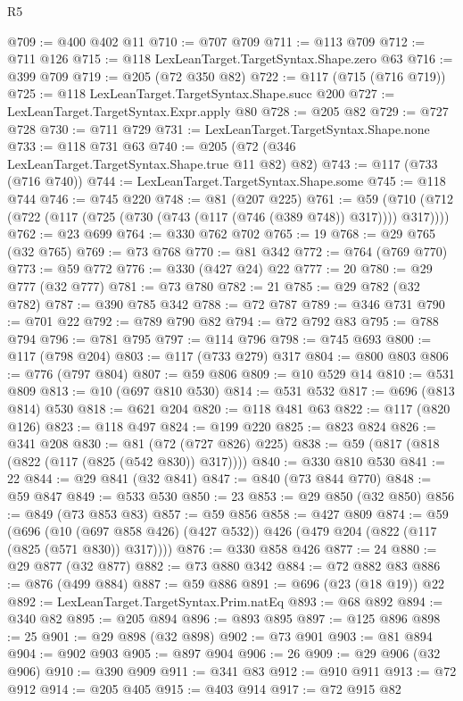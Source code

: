 \begin{lexlean}{R5}
\begin{coremodule}
{{{{{{{{{{{{{{{{{{{{{{{{{{{{{{{{{{{{{{{{{{{{{{{{{{{{{{{{{{{{{{{{{{{{{{{{{{{{{{{{{{{{{{{{{{{{@709 := @400 @402 @11
@710 := @707 @709
@711 := @113 @709
@712 := @711 @126
@715 := @118 LexLeanTarget.TargetSyntax.Shape.zero @63
@716 := @399 @709
@719 := @205 (@72 @350 @82)
@722 := @117 (@715 (@716 @719))
@725 := @118 LexLeanTarget.TargetSyntax.Shape.succ @200
@727 := LexLeanTarget.TargetSyntax.Expr.apply @80
@728 := @205 @82
@729 := @727 @728
@730 := @711 @729
@731 := LexLeanTarget.TargetSyntax.Shape.none
@733 := @118 @731 @63
@740 := @205 (@72 (@346 LexLeanTarget.TargetSyntax.Shape.true @11 @82) @82)
@743 := @117 (@733 (@716 @740))
@744 := LexLeanTarget.TargetSyntax.Shape.some
@745 := @118 @744
@746 := @745 @220
@748 := @81 (@207 @225)
@761 := @59 (@710 (@712 (@722 (@117 (@725 (@730 (@743 (@117 (@746 (@389 @748)) @317)))) @317))))
@762 := @23 @699
@764 := @330 @762 @702
@765 := 19
@768 := @29 @765 (@32 @765)
@769 := @73 @768
@770 := @81 @342
@772 := @764 (@769 @770)
@773 := @59 @772
@776 := @330 (@427 @24) @22
@777 := 20
@780 := @29 @777 (@32 @777)
@781 := @73 @780
@782 := 21
@785 := @29 @782 (@32 @782)
@787 := @390 @785 @342
@788 := @72 @787
@789 := @346 @731
@790 := @701 @22
@792 := @789 @790 @82
@794 := @72 @792 @83
@795 := @788 @794
@796 := @781 @795
@797 := @114 @796
@798 := @745 @693
@800 := @117 (@798 @204)
@803 := @117 (@733 @279) @317
@804 := @800 @803
@806 := @776 (@797 @804)
@807 := @59 @806
@809 := @10 @529 @14
@810 := @531 @809
@813 := @10 (@697 @810 @530)
@814 := @531 @532
@817 := @696 (@813 @814) @530
@818 := @621 @204
@820 := @118 @481 @63
@822 := @117 (@820 @126)
@823 := @118 @497
@824 := @199 @220
@825 := @823 @824
@826 := @341 @208
@830 := @81 (@72 (@727 @826) @225)
@838 := @59 (@817 (@818 (@822 (@117 (@825 (@542 @830)) @317))))
@840 := @330 @810 @530
@841 := 22
@844 := @29 @841 (@32 @841)
@847 := @840 (@73 @844 @770)
@848 := @59 @847
@849 := @533 @530
@850 := 23
@853 := @29 @850 (@32 @850)
@856 := @849 (@73 @853 @83)
@857 := @59 @856
@858 := @427 @809
@874 := @59
    (@696 (@10 (@697 @858 @426) (@427 @532)) @426 (@479 @204 (@822 (@117 (@825 (@571 @830)) @317))))
@876 := @330 @858 @426
@877 := 24
@880 := @29 @877 (@32 @877)
@882 := @73 @880 @342
@884 := @72 @882 @83
@886 := @876 (@499 @884)
@887 := @59 @886
@891 := @696 (@23 (@18 @19)) @22
@892 := LexLeanTarget.TargetSyntax.Prim.natEq
@893 := @68 @892
@894 := @340 @82
@895 := @205 @894
@896 := @893 @895
@897 := @125 @896
@898 := 25
@901 := @29 @898 (@32 @898)
@902 := @73 @901
@903 := @81 @894
@904 := @902 @903
@905 := @897 @904
@906 := 26
@909 := @29 @906 (@32 @906)
@910 := @390 @909
@911 := @341 @83
@912 := @910 @911
@913 := @72 @912
@914 := @205 @405
@915 := @403 @914
@917 := @72 @915 @82
}}}}}}}}}}}}}}}}}}}}}}}}}}}}}}}}}}}}}}}}}}}}}}}}}}}}}}}}}}}}}}}}}}}}}}}}}}}}}}}}}}}}}}}}}}}}
\end{coremodule}
\end{lexlean}
